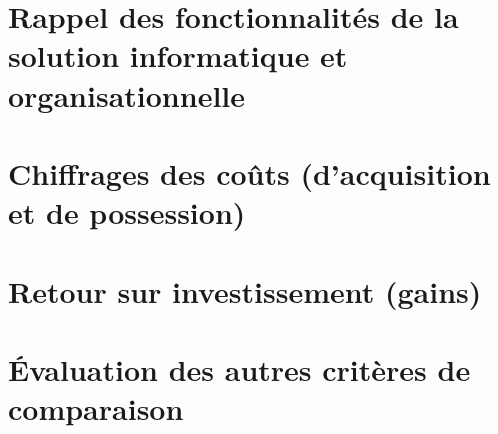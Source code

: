 \section{Rappel des fonctionnalités de la solution informatique et organisationnelle}


\section{Chiffrages des coûts (d'acquisition et de possession)}


\section{Retour sur investissement (gains)}


\section{Évaluation des autres critères de comparaison}

